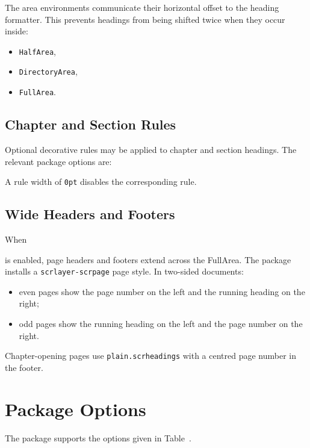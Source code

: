 \documentclass[
11pt,
a4paper,
oneside
]{scrbook}
\begin{document}
The area environments communicate their horizontal offset to the heading
formatter.
This prevents headings from being shifted twice when they occur inside:
\begin{itemize}
	\item \texttt{HalfArea},
	\item \texttt{DirectoryArea},
	\item \texttt{FullArea}.
\end{itemize}

\section{Chapter and Section Rules}

Optional decorative rules may be applied to chapter and section headings.
The relevant package options are:




A rule width of \texttt{0pt} disables the corresponding rule.

\section{Wide Headers and Footers}

When




	is enabled, page headers and footers extend across the FullArea.
	The package installs a \texttt{scrlayer-scrpage} page style.
	In two-sided documents:
	\begin{itemize}
		\item even pages show the page number on the left and the running heading
		on the right;
		\item odd pages show the running heading on the left and the page number
		on the right.
	\end{itemize}
	Chapter-opening pages use \texttt{plain.scrheadings} with a centred page
	number in the footer.
	
\chapter{Package Options}
\label{chap:options}
The \MDWordmark package supports the options given in
Table~.
\end{document}
